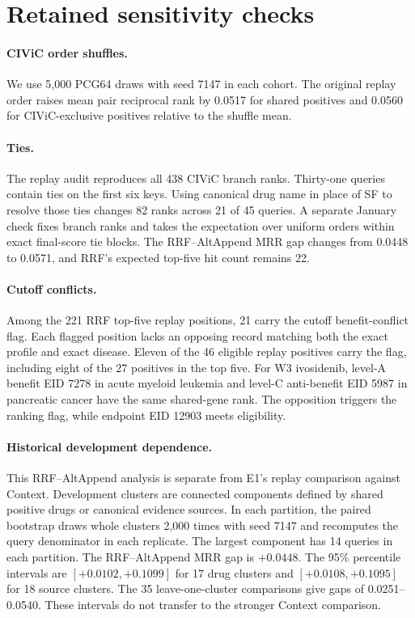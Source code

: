 \documentclass[runningheads]{llncs}
\begin{document}
\section{Retained sensitivity checks}

\paragraph{CIViC order shuffles.}
We use 5,000 PCG64 draws with seed 7147 in each cohort. The original replay order raises mean pair reciprocal rank by 0.0517 for shared positives and 0.0560 for CIViC-exclusive positives relative to the shuffle mean.

\paragraph{Ties.}
The replay audit reproduces all 438 CIViC branch ranks. Thirty-one queries contain ties on the first six keys. Using canonical drug name in place of SF to resolve those ties changes 82 ranks across 21 of 45 queries. A separate January check fixes branch ranks and takes the expectation over uniform orders within exact final-score tie blocks. The RRF--AltAppend MRR gap changes from 0.0448 to 0.0571, and RRF's expected top-five hit count remains 22.

\paragraph{Cutoff conflicts.}
Among the 221 RRF top-five replay positions, 21 carry the cutoff benefit-conflict flag. Each flagged position lacks an opposing record matching both the exact profile and exact disease. Eleven of the 46 eligible replay positives carry the flag, including eight of the 27 positives in the top five. For W3 ivosidenib, level-A benefit EID 7278 in acute myeloid leukemia and level-C anti-benefit EID 5987 in pancreatic cancer have the same shared-gene rank. The opposition triggers the ranking flag, while endpoint EID 12903 meets eligibility.

\paragraph{Historical development dependence.}
This RRF--AltAppend analysis is separate from E1's replay comparison against Context. Development clusters are connected components defined by shared positive drugs or canonical evidence sources. In each partition, the paired bootstrap draws whole clusters 2,000 times with seed 7147 and recomputes the query denominator in each replicate. The largest component has 14 queries in each partition. The RRF--AltAppend MRR gap is $+0.0448$. The 95\% percentile intervals are $[+0.0102,+0.1099]$ for 17 drug clusters and $[+0.0108,+0.1095]$ for 18 source clusters. The 35 leave-one-cluster comparisons give gaps of 0.0251--0.0540. These intervals do not transfer to the stronger Context comparison.
\end{document}
